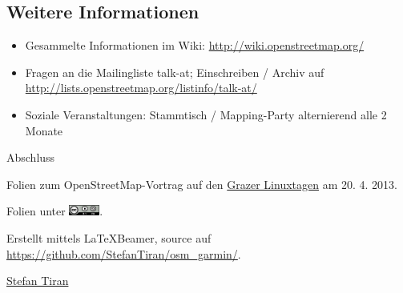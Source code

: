 \documentclass{beamer}
\begin{document}
\subsection{Weitere Informationen}
\begin{frame}
\begin{itemize}
  \item Gesammelte Informationen im Wiki:
    \url{http://wiki.openstreetmap.org/}
  \item Fragen an die Mailingliste talk-at; Einschreiben / Archiv auf \url{http://lists.openstreetmap.org/listinfo/talk-at/}
  \item Soziale Veranstaltungen: Stammtisch / Mapping-Party
    alternierend alle 2 Monate
\end{itemize}
\end{frame}
\begin{frame}{Abschluss}

Folien zum OpenStreetMap-Vortrag auf den
\href{http://http://linuxtage.at/}{Grazer Linuxtagen} am 20. 4. 2013.
\vspace{1cm}

Folien unter \includegraphics[width=1cm]{cc-by-sa.png}.
\vspace{1cm}

Erstellt mittels \LaTeX Beamer, source auf \url{https://github.com/StefanTiran/osm_garmin/}.
\vspace{1cm}

\href{mailto:stefan.tiran@student.TUGraz.at}{Stefan Tiran}
\end{frame}
\end{document}
